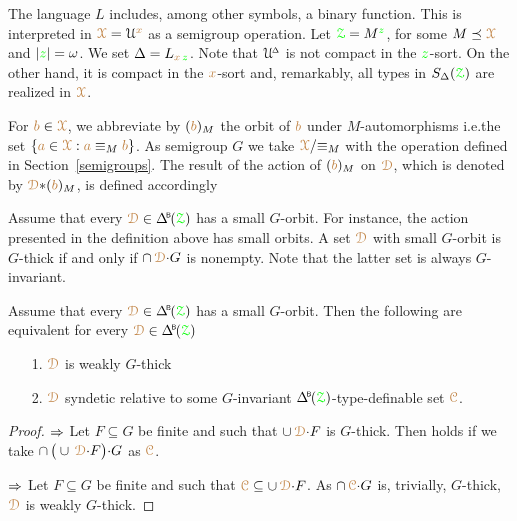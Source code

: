 \begin{definition}
  The language $L$ includes, among other symbols, a binary function.
  This is interpreted in ${\color{brown}\EuScript X}=\EuScript U^{\color{brown} x}$ as a semigroup operation.
  Let ${\color{green}\EuScript Z}=M^{\color{green} z}$, for some $M\preceq{\color{brown}\EuScript X}$ and $|{\color{green} z}|=\omega$.
  We set $\Delta=L_{{\color{brown} x}\,{\color{green} z}}$.
  Note that $\EuScript U\kern-.2ex^{\scriptscriptstyle\Delta}$ is not compact in the ${\color{green} z}$-sort.
  On the other hand, it is compact in the ${\color{brown} x}$-sort and, remarkably, all types in $S_\Delta({\color{green}\EuScript Z})$ are realized in ${\color{brown}\EuScript X}$.\smallskip

  For ${\color{brown} b}\in{\color{brown}\EuScript X}$, we abbreviate by $({\color{brown} b})_M$ the orbit of ${\color{brown} b}$ under $M$-automorphisms i.e.\@ the set $\{{\color{brown} a}\in{\color{brown}\EuScript X}:{\color{brown} a}\equiv_M{\color{brown} b}\}$.
  As semigroup $G$ we take ${\color{brown}\EuScript X}/{\equiv_M}$ with the operation defined in Section~\ref{semigroups}.
  The result of the action of $({\color{brown} b})_M$ on ${\color{brown}\EuScript D}$, which is denoted by ${\color{brown}\EuScript D} {*} ({\color{brown} b})_M$, is defined accordingly\smallskip

  \smallskip

\end{definition}

Assume that every $\mrD\in\BDelta(\grZ)$ has a small $G$-orbit.
For instance, the action presented in the definition above has small orbits.
A set ${\color{brown}\EuScript D}$ with small $G$-orbit is $G$-thick if and only if $\cap\,{\color{brown}\EuScript D}{\cdot}G$ is nonempty.
Note that the latter set is always $G$-invariant.

\begin{proposition}
  Assume that every $\mrD\in\BDelta(\grZ)$ has a small $G$-orbit.
  Then the following are equivalent for every $\mrD\in\BDelta(\grZ)$
  \begin{itemize}
    \item [1.] ${\color{brown}\EuScript D}$ is weakly $G$-thick
    \item [2.]${\color{brown}\EuScript D}$ syndetic relative to some $G$-invariant $\BDelta(\grZ)$-type-definable set ${\color{brown}\EuScript C}$.
  \end{itemize}
\end{proposition}

\begin{proof}
  $\Rightarrow$ Let $F\subseteq G$ be finite and such that $\cup\,{\color{brown}\EuScript D}{\cdot}F$ is $G$-thick.
  Then  holds if we take $\cap\,\big(\cup\,{\color{brown}\EuScript D}{\cdot}F\big){\cdot}G$ as ${\color{brown}\EuScript C}$.

  $\Rightarrow$ Let $F\subseteq G$ be finite and such that ${\color{brown}\EuScript C}\subseteq\cup\,{\color{brown}\EuScript D}{\cdot}F$.
  As $\cap\,{\color{brown}\EuScript C}{\cdot}G$ is, trivially, $G$-thick, ${\color{brown}\EuScript D}$ is weakly $G$-thick.
\end{proof}

